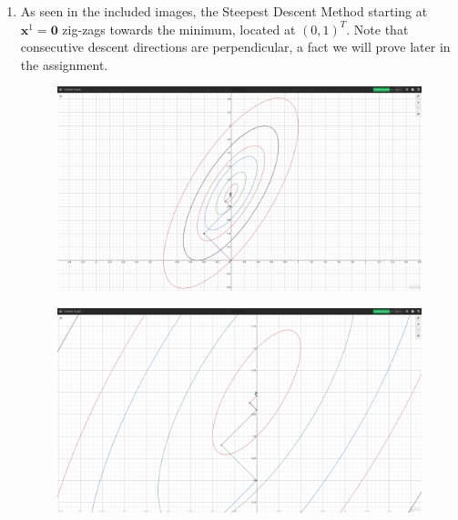 \documentclass[a4paper,11pt]{article}
\newcommand{\ds}{\displaystyle}
\begin{document}
{{\begin{enumerate}[leftmargin=*]
\begin{enumerate}[label=\alph*)]
\begin{align*}
																			   & = \frac{4}{5^{2k+2}}\theta^2 -\frac{8}{5^{2k+2}}\theta + \frac{1}{5^{2k+2}}-1 \\
						\therefore \frac{df\left(\mathbf{x}^{2k+1} + \theta \mathbf{d}^{2k+1}\right)}{d\theta} & = \frac{8}{5^{2+2k}}\theta -\frac{8}{5^{2k+2}}.
					\end{align*}
					Setting the derivative to 0 to find the minimum, we have,
					\begin{align*}
						\frac{df\left(\mathbf{x}^{2k+1} + \theta \mathbf{d}^{2k+1}\right)}{d\theta} & = 0 \\
						\therefore \frac{8}{5^{2+2k}}\theta -\frac{8}{5^{2k+2}} & = 0 \\
						\therefore \theta_{2k+2} & = 1. \\
						\therefore \mathbf{x}^{2k+3} & = \mathbf{x}^{2k+2} + \theta_{2k+2} \mathbf{d}^{2k+2} \\
													 & = \left(0, \:1-\frac{1}{5^{k+1}}\right)^T.
					\end{align*}

				\item As seen in the included images, the Steepest Descent Method starting at $\ds{\mathbf{x}^1 = \mathbf{0}}$ zig-zags towards the minimum, located at $\ds{(0,1)^T}$. Note that consecutive descent directions are perpendicular, a fact we will prove later in the assignment.
					\pagebreak
					\begin{figure}[!ht]
						\includegraphics[width=\linewidth]{plane.png}
					\end{figure}
					\begin{figure}[!ht]
						\includegraphics[width=\linewidth]{zoom.png}
					\end{figure}
					


\end{enumerate}
\end{enumerate}}}
\end{document}

